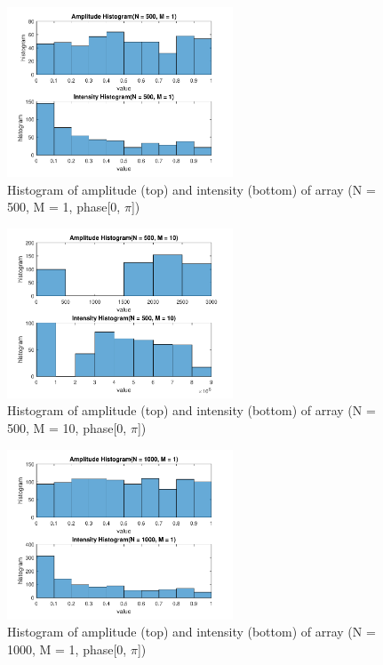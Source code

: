 \documentclass{article}
\begin{document}
\begin{figure}[H]
	\centering
	\includegraphics[width = 0.6\textwidth]{src/pi/hist_500_1.pdf}
	\caption{Histogram of amplitude (top) and intensity (bottom) of array (N = 500, M = 1, phase[0, $\pi$])}
	\label{fig:hist-500-1-pi}
\end{figure}
\begin{figure}[H]
	\centering
	\includegraphics[width = 0.6\textwidth]{src/pi/hist_500_10.pdf}
	\caption{Histogram of amplitude (top) and intensity (bottom) of array (N = 500, M = 10, phase[0, $\pi$])}
	\label{fig:hist-500-10-pi}
\end{figure}
\begin{figure}[H]
	\centering
	\includegraphics[width = 0.6\textwidth]{src/pi/hist_1000_1.pdf}
	\caption{Histogram of amplitude (top) and intensity (bottom) of array (N = 1000, M = 1, phase[0, $\pi$])}
	\label{fig:hist-1000-1-pi}
\end{figure}
\end{document}
